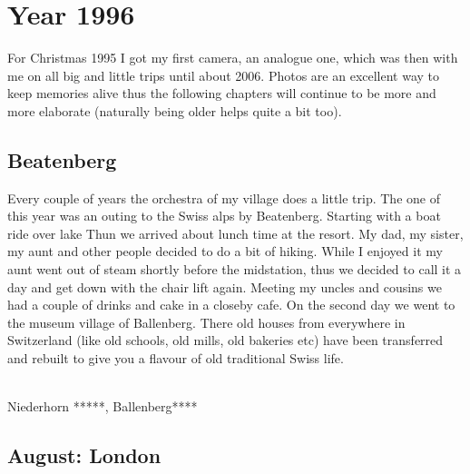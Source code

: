 \chapter{Year 1996}
\label{1996}

For Christmas 1995 I got my first camera, an analogue one, which was then with me on all big and little trips until about 2006. Photos are an excellent way to keep memories alive thus the following chapters will continue to be more and more elaborate (naturally being older helps quite a bit too).

\section{Beatenberg}
\label{1996:Beatenberg}

Every couple of years the orchestra of my village does a little trip. The one of this year was an outing to the Swiss alps by Beatenberg. Starting with a boat ride over lake Thun we arrived about lunch time at the resort. My dad, my sister, my aunt and other people decided to do a bit of hiking. While I enjoyed it my aunt went out of steam shortly before the midstation, thus we decided to call it a day and get down with the chair lift again. Meeting my uncles and cousins we had a couple of drinks and cake in a closeby cafe. On the second day we went to the museum village of Ballenberg. There old houses from everywhere in Switzerland (like old schools, old mills, old bakeries etc) have been transferred and rebuilt to give you a flavour of old traditional Swiss life. \\\

Niederhorn *****, Ballenberg****

\section{August: London}
\label{1996:London}


